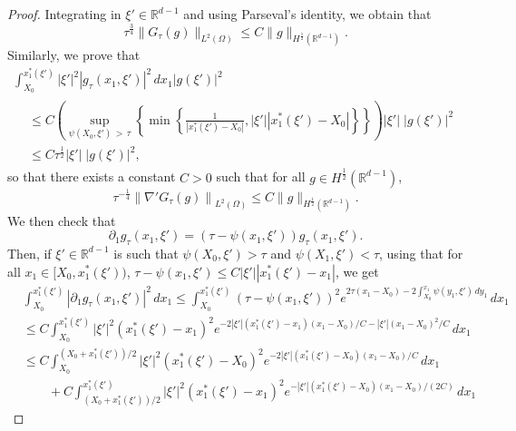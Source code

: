 \documentclass[AHL,Unicode,longabstracts]{cedram}
\newcommand*\R{\mathbb{R}}
\renewcommand{\leq}{\leqslant}
\begin{document}
\begin{proof}
Integrating in $\xi' \in \R^{d-1}$ and using Parseval's identity, we obtain that
\begin{equation*}
\tau^{\frac{3}{4}} \| G_{\tau} (g) \|_{L^2(\Omega)}
\leq C \| g \|_{H^{\frac{1}{2}}\left(\R^{d-1}\right)}.
\end{equation*}
Similarly, we prove that
\begin{multline*}
\int_{X_0}^{x_1^*(\xi')} \left|\xi'\right|^2 \left|g_\tau(x_1, \xi')\right|^2 \, dx_1 \left|g(\xi')\right|^2
\\
\begin{aligned}
&\leq  C 
\left( \sup_{\psi(X_0, \xi')\, >\,\tau}
\left\{
\min\left\{\frac{1}{\left|x_1^*(\xi')
-  X_0\right|}, |\xi'| \left|x_1^*(\xi')- X_0\right| \right\}
\right\} \!\right) \left|\xi'\right|\; |g(\xi')|^2\\
&\leq   C \tau^{\frac{1}{2}} \left|\xi'\right|\; \left|g(\xi')\right|^2,
\end{aligned}
\end{multline*}
so that there exists a constant $C>0$ such that for all $g \in H^{\frac{1}{2}}(\R^{d-1})$,
\begin{equation*}
\tau^{-\frac{1}{4}} \left\|\nabla' G_{\tau} (g) \right\|_{L^2(\Omega)}
\leq C \| g \|_{H^{\frac{1}{2}}\left(\R^{d-1}\right)}.
\end{equation*}
We then check that
\[
\partial_1 g_\tau(x_1, \xi') = \left(\tau - \psi(x_1, \xi')\right) g_{\tau}\left(x_1, \xi'\right).
\]
Then, if $\xi' \in \R^{d-1}$ is such that $\psi(X_0, \xi') > \tau$ and $\psi(X_1, \xi') < \tau$, using that for all $x_1 \in [X_0, x_1^*(\xi'))$, $\tau - \psi(x_1, \xi') \leq C |\xi'| |x_1^*(\xi') - x_1|$, we get
\begin{align*}
& \int_{X_0}^{x_1^*(\xi')} \left|\partial_1 g_\tau(x_1, \xi')\right|^2 \, dx_1
\leq
\int_{X_0}^{x_1^*(\xi')} \left(\tau - \psi(x_1, \xi')\right)^2 e^{2 \tau (x_1 -X_0) - 2 \int_{X_0}^{x_1} \psi(y_1, \xi') \, dy_1 } \, dx_1
\\
& \leq C \int_{X_0}^{x_1^*(\xi')} \left|\xi'\right|^2 \left(x_1^*(\xi') - x_1\right)^2 e^{- 2 \left|\xi'\right| \left(x_1^*(\xi') - x_1\right) (x_1 -X_0)/C - |\xi'| (x_1- X_0)^2/C} \, dx_1
\\
& \leq C \int_{X_0}^{\left(X_0+x_1^*(\xi')\right)/2} |\xi'|^2 \left(x_1^*(\xi') - X_0\right)^2 e^{- 2 |\xi'|\left(x_1^*(\xi') - X_0\right) (x_1 -X_0)/C} \, dx_1
\\
& \qquad + C \int_{\left(X_0+x_1^*(\xi')\right)/2}^{x_1^*(\xi')} |\xi'|^2 \left(x_1^*(\xi') - x_1\right)^2 e^{- |\xi'| \left(x_1^*(\xi') - X_0\right) (x_1- X_0)/(2C)} \, dx_1

\end{align*}
\end{proof}
\end{document}
